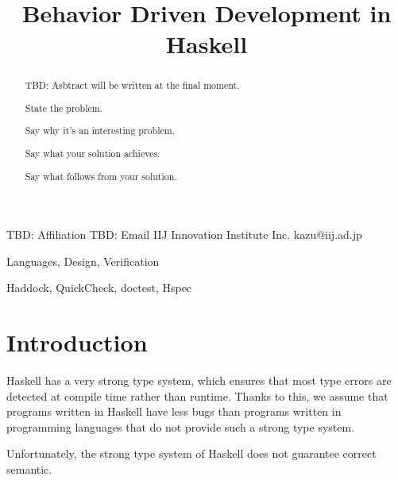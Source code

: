 \documentclass[preprint]{sigplanconf}
\begin{document}
\copyrightdata{[to be supplied]}


\title{Behavior Driven Development in Haskell}

           {TBD: Affiliation}
           {TBD: Email}
           {IIJ Innovation Institute Inc.}
           {kazu@iij.ad.jp}

\maketitle

\begin{abstract}

TBD: Asbtract will be written at the final moment.

State the problem.

Say why it’s an interesting problem.

Say what your solution achieves.

Say what follows from your solution.

\end{abstract}


\terms Languages, Design, Verification

\keywords Haddock, QuickCheck, doctest, Hspec

\section{Introduction}


Haskell has a very strong type system, which ensures that most type errors are
detected at compile time rather than runtime.  Thanks to this, we assume that
programs written in Haskell have less bugs than programs written in programming
languages that do not provide such a strong type system.

Unfortunately, the strong type system of Haskell does not guarantee correct
semantic.
\end{document}

